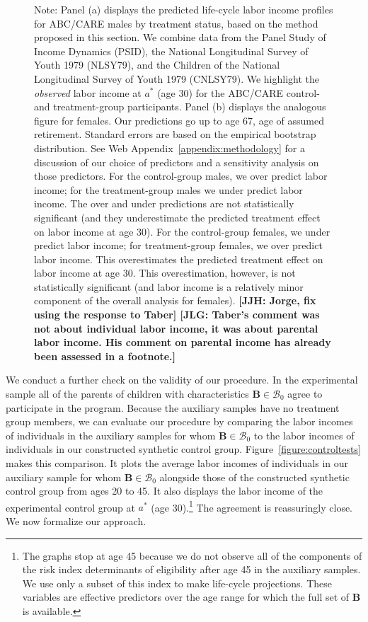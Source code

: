 \begin{figure}
Note: Panel (a) displays the predicted life-cycle labor income profiles for ABC/CARE males by treatment status, based on the method proposed in this section. We combine data from the Panel Study of Income Dynamics (PSID), the National Longitudinal Survey of Youth 1979 (NLSY79), and the Children of the National Longitudinal Survey of Youth 1979 (CNLSY79). We highlight the \textit{observed} labor income at $a^*$ (age 30) for the ABC/CARE control- and treatment-group participants. Panel (b) displays the analogous figure for females. Our predictions go up to age 67, age of assumed retirement. Standard errors are based on the empirical bootstrap distribution. See Web Appendix~\ref{appendix:methodology} for a discussion of our choice of predictors and a sensitivity analysis on those predictors. For the control-group males, we over predict labor income; for the treatment-group males we under predict labor income. The over and under predictions are not statistically significant (and they underestimate the predicted treatment effect on labor income at age 30). For the control-group females, we under predict labor income; for treatment-group females, we over predict labor income. This overestimates the predicted treatment effect on labor income at age 30. This overestimation, however, is not statistically significant (and labor income is a relatively minor component of the overall analysis for females). \textbf{[JJH: Jorge, fix using the response to Taber] [JLG: Taber's comment was not about individual labor income, it was about parental labor income. His comment on parental income has already been assessed in a footnote.] }
\end{figure}

We conduct a further check on the validity of our procedure. In the experimental sample all of the parents of children with characteristics $\bm{B} \in \mathcal{B}_0$ agree to participate in the program.  Because the auxiliary samples have no treatment group members, we can evaluate our procedure by comparing the labor incomes of individuals in the auxiliary samples for whom $\bm{B} \in \mathcal{B}_0$ to the labor incomes of individuals in our constructed synthetic control group. Figure~\ref{figure:controltests} makes this comparison. It plots the average labor incomes of individuals in our auxiliary sample for whom $\bm{B} \in \mathcal{B}_0$ alongside those of the constructed synthetic control group from ages 20 to 45. It also displays the labor income of the experimental control group at $a^*$ (age 30).\footnote{The graphs stop at age 45 because we do not observe all of the components of the risk index determinants of eligibility after age 45 in the auxiliary samples. We use only a subset of this index to make life-cycle projections. These variables are effective predictors over the age range for which the full set of $\bm{B}$ is available.} The agreement is reassuringly close. We now formalize our approach.

